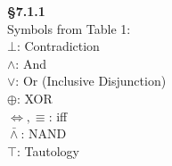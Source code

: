 \documentclass[12pt]{article}
\date{} %
\begin{document}
\textbf{\S 7.1.1}\\
Symbols from Table 1:\\
$\bot$: Contradiction\\
$\land$: And\\
$\lor$: Or (Inclusive Disjunction)\\
$\oplus$: XOR\\
$\Leftrightarrow , \equiv$: iff\\
$\bar{\land}$: NAND\\
$\top$: Tautology\\
\end{document}
